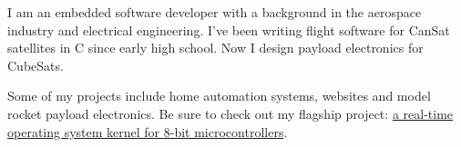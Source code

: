 \documentclass[letter,10pt]{article}
\begin{document}
    \begin{justify}
        I am an embedded software developer with a background in the aerospace industry and electrical engineering. I've been writing flight software for CanSat satellites in C since early high school. Now I design payload electronics for CubeSats.
        \setlength{\parskip}{1em}
        \setlength{\parindent}{0em}

        Some of my projects include home automation systems, websites and model rocket payload electronics. Be sure to check out my flagship project: \href{https://github.com/cansat-ptl/cubesat-rtos}{a real-time operating system kernel for 8-bit microcontrollers}.
    \end{justify}
\end{document}

